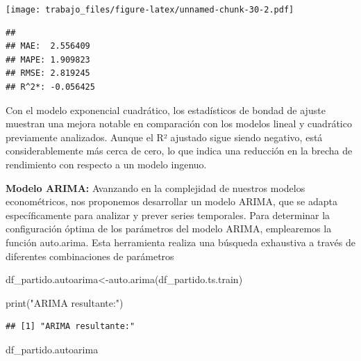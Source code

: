 \documentclass[
]{article}
\newenvironment{Shaded}{\begin{snugshade}}{\end{snugshade}}
\newcommand{\FunctionTok}[1]{\textcolor[rgb]{0.00,0.00,0.00}{#1}}
\newcommand{\NormalTok}[1]{#1}
\newcommand{\OtherTok}[1]{\textcolor[rgb]{0.56,0.35,0.01}{#1}}
\newcommand{\SpecialCharTok}[1]{\textcolor[rgb]{0.00,0.00,0.00}{#1}}
\newcommand{\StringTok}[1]{\textcolor[rgb]{0.31,0.60,0.02}{#1}}
\begin{document}
\texttt{[image: trabajo\_files/figure-latex/unnamed-chunk-30-2.pdf]}

\begin{Shaded}
\end{Shaded}

\begin{verbatim}
## 
## MAE:  2.556409 
## MAPE: 1.909823 
## RMSE: 2.819245 
## R^2*: -0.056425
\end{verbatim}

Con el modelo exponencial cuadrático, los estadísticos de bondad de
ajuste muestran una mejora notable en comparación con los modelos lineal
y cuadrático previamente analizados. Aunque el R² ajustado sigue siendo
negativo, está considerablemente más cerca de cero, lo que indica una
reducción en la brecha de rendimiento con respecto a un modelo ingenuo.

\textbf{Modelo ARIMA:} Avanzando en la complejidad de nuestros modelos
econométricos, nos proponemos desarrollar un modelo ARIMA, que se adapta
específicamente para analizar y prever series temporales. Para
determinar la configuración óptima de los parámetros del modelo ARIMA,
emplearemos la función auto.arima. Esta herramienta realiza una búsqueda
exhaustiva a través de diferentes combinaciones de parámetros

\begin{Shaded}
\begin{Highlighting}[]
\NormalTok{df\_partido.autoarima}\OtherTok{\textless{}{-}}\FunctionTok{auto.arima}\NormalTok{(df\_partido.ts.train)}

\FunctionTok{print}\NormalTok{(}\StringTok{"ARIMA resultante:"}\NormalTok{)}
\end{Highlighting}
\end{Shaded}

\begin{verbatim}
## [1] "ARIMA resultante:"
\end{verbatim}

\begin{Shaded}
\begin{Highlighting}[]
\NormalTok{df\_partido.autoarima}
\end{Highlighting}
\end{Shaded}
\end{document}
